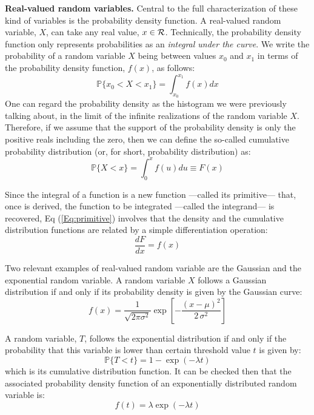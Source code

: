 \documentclass{article}
\newcommand{\Pb}{{\mathbb P}}
\begin{document}
{\bf Real-valued random variables.} Central to the full characterization of these kind of variables is the probability density function. A real-valued random variable, $X$, can take any real value, $x \in \cal{R}$. Technically, the probability density function only represents probabilities as an {\it integral under the curve}. We write the probability of a random variable $X$ being between values $x_0$ and $x_1$ in terms of the probability density function, $f(x)$, as follows:
\begin{equation}
    \Pb\{ x_0 < X < x_1 \} = \int_{x_0}^{x_1} f(x)dx
\end{equation}
One can regard the probability density as the histogram we were previously talking about, in the limit of the infinite realizations of the random variable $X$. Therefore, if we assume that the support of the probability density is only the positive reals including the zero, then we can define the so-called cumulative probability distribution (or, for short, probability distribution) as:
\begin{equation}
    \Pb\{ X < x \} = \int_{0}^{x} f(u)du \equiv F(x)
    \label{Eq:primitive}
\end{equation}

Since the integral of a function is a new function ---called its primitive--- that, once is derived, the function to be integrated ---called the integrand--- is recovered, Eq (\ref{Eq:primitive}) involves that the density and the cumulative distribution functions are related by a simple differentiation operation:
\begin{equation}
    \frac{dF}{dx} = f(x)
\end{equation} 
\smallskip

Two relevant examples of real-valued random variable are the Gaussian and the exponential random variable. A random variable $X$ follows a Gaussian distribution if and only if its probability density is given by the Gaussian curve:
\begin{equation}
    f(x) = \frac{1}{\sqrt{2\pi\sigma^2}}\exp\left[-\frac{(x-\mu)^2}{2\,\sigma^2}\right] 
\end{equation}
\small

A random variable, $T$, follows the exponential distribution if and only if the probability that this variable is lower than certain threshold value $t$ is given by: 
\begin{equation}
    \Pb\{ T < t \} = 1 - \exp (-\lambda t)
    \label{Exponential_Distribution}
\end{equation}
which is its cumulative distribution function. It can be checked then that the associated probability density function of an exponentially distributed random variable is: 
\begin{equation}
    f(t) = \lambda \exp (-\lambda t)
\end{equation}
\end{document}
